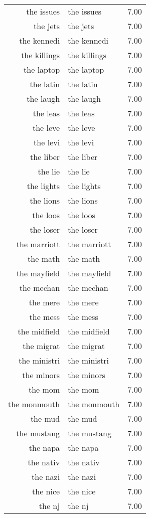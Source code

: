 \begin{table}[ht]
\begin{tabular}{rlr}
  the issues & the issues & 7.00 \\ 
  the jets & the jets & 7.00 \\ 
  the kennedi & the kennedi & 7.00 \\ 
  the killings & the killings & 7.00 \\ 
  the laptop & the laptop & 7.00 \\ 
  the latin & the latin & 7.00 \\ 
  the laugh & the laugh & 7.00 \\ 
  the leas & the leas & 7.00 \\ 
  the leve & the leve & 7.00 \\ 
  the levi & the levi & 7.00 \\ 
  the liber & the liber & 7.00 \\ 
  the lie & the lie & 7.00 \\ 
  the lights & the lights & 7.00 \\ 
  the lions & the lions & 7.00 \\ 
  the loos & the loos & 7.00 \\ 
  the loser & the loser & 7.00 \\ 
  the marriott & the marriott & 7.00 \\ 
  the math & the math & 7.00 \\ 
  the mayfield & the mayfield & 7.00 \\ 
  the mechan & the mechan & 7.00 \\ 
  the mere & the mere & 7.00 \\ 
  the mess & the mess & 7.00 \\ 
  the midfield & the midfield & 7.00 \\ 
  the migrat & the migrat & 7.00 \\ 
  the ministri & the ministri & 7.00 \\ 
  the minors & the minors & 7.00 \\ 
  the mom & the mom & 7.00 \\ 
  the monmouth & the monmouth & 7.00 \\ 
  the mud & the mud & 7.00 \\ 
  the mustang & the mustang & 7.00 \\ 
  the napa & the napa & 7.00 \\ 
  the nativ & the nativ & 7.00 \\ 
  the nazi & the nazi & 7.00 \\ 
  the nice & the nice & 7.00 \\ 
  the nj & the nj & 7.00 \\ 

\end{tabular}
\end{table}
